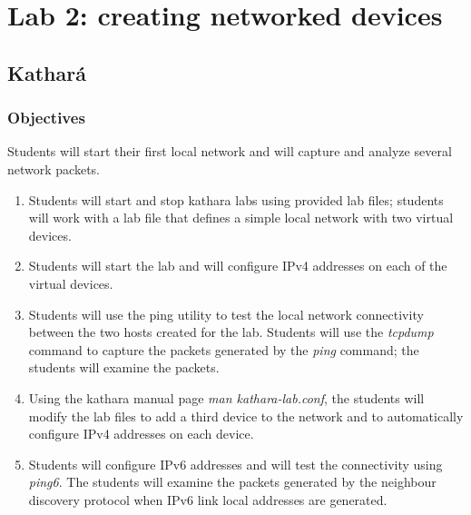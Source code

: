 \documentclass[12pt]{book}
\newcommand{\kathara}{Kathar\'a}
\begin{document}
  

\chapter{Lab 2: creating networked devices}

\section{\kathara}

\subsection{Objectives}

Students will start their first local network and will capture and analyze several network packets. 

\begin{enumerate}[label=Objective \arabic*]

\item\label{startstop} Students will start and stop kathara labs using provided lab files; students will work with a lab file that defines a simple local network with two virtual devices.

\item\label{ipv4.2} Students will start the lab and will configure IPv4 addresses on each of the virtual devices. 

\item\label{tcpdump}  Students will use the ping utility to test the local network connectivity between the two hosts created for the lab. Students will use the \emph{tcpdump} command to capture the packets generated by the \emph{ping} command; the students will examine the packets.

\item\label{modifylab} Using the kathara manual page \emph{man kathara-lab.conf}, the students will modify the lab files to add a third device to the network and to automatically configure IPv4 addresses on each device.

\item\label{ipv6.2}  Students will configure IPv6 addresses and will test the
  connectivity using \emph{ping6}. The students will examine the packets generated by the neighbour discovery protocol when IPv6 link local addresses are generated. 

\end{enumerate}
\end{document}
